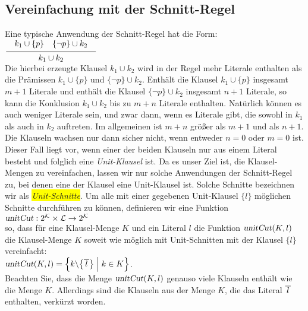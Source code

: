 \subsection{Vereinfachung mit der Schnitt-Regel}
Eine typische Anwendung der Schnitt-Regel hat die Form: \\[0.2cm]
\hspace*{1.3cm} $\schluss{ k_1 \cup \{p\} \quad \{\neg p\} \cup k_2}{k_1 \cup k_2}$
\\[0.2cm]
Die hierbei erzeugte Klausel $k_1 \cup k_2$ wird in der Regel mehr Literale enthalten
als die Pr\"{a}missen $k_1 \cup \{p\}$ und $\bigl\{\neg p\} \cup k_2$.  Enth\"{a}lt die
Klausel $k_1 \cup \{p\}$ insgesamt $m+1$ Literale und enth\"{a}lt die Klausel
$\bigl\{\neg p\} \cup k_2$ insgesamt $n+1$ Literale, so kann die Konklusion $k_1 \cup k_2$ 
bis zu $m + n$ Literale enthalten.  Nat\"{u}rlich k\"{o}nnen es auch weniger Literale 
sein, und zwar dann, wenn es Literale gibt, die sowohl in $k_1$ als auch in $k_2$
auftreten.  Im allgemeinen ist $m + n$ gr\"{o}\ss{}er als $m + 1$ und als $n + 1$.  Die
Klauseln wachsen nur dann sicher nicht, wenn entweder $n = 0$ oder $m = 0$ ist.
Dieser Fall liegt vor, wenn einer der beiden Klauseln nur aus einem Literal besteht
und folglich eine \emph{Unit-Klausel} ist.  Da es unser Ziel ist, die Klausel-Mengen
zu vereinfachen, lassen wir nur solche Anwendungen der Schnitt-Regel zu, bei denen
eine der Klausel eine Unit-Klausel ist.  Solche Schnitte bezeichnen wir als
\colorbox{yellow}{\emph{Unit-Schnitte}}.  Um alle mit einer gegebenen Unit-Klausel $\{l\}$ m\"{o}glichen Schnitte
durchf\"{u}hren zu k\"{o}nnen, definieren wir eine Funktion
\\[0.2cm]
\hspace*{1.3cm}
$\textsl{unitCut}: 2^\mathcal{K} \times \mathcal{L} \rightarrow 2^\mathcal{K}$
\\[0.2cm]
so, dass f\"{u}r eine Klausel-Menge $K$ und ein Literal $l$ die Funktion
$\textsl{unitCut}(K,l)$ die Klausel-Menge $K$ soweit wie m\"{o}glich mit Unit-Schnitten mit der Klausel
$\{l\}$ vereinfacht:
\\[0.2cm]
\hspace*{1.3cm}
$\textsl{unitCut}(K,l) = \Bigl\{ k \backslash \bigl\{ \overline{\,l\,} \bigr\} \;\Big|\; k \in K \Bigr\}$.
\\[0.2cm]
Beachten Sie, dass die Menge $\textsl{unitCut}(K,l)$ genauso viele Klauseln enth\"{a}lt wie die Menge
$K$.  Allerdings sind die Klauseln aus der Menge $K$, die das Literal $\overline{\,l\,}$
enthalten, verk\"{u}rzt worden. 

